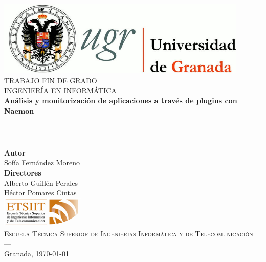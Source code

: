 \begin{titlepage}

\newlength{\centeroffset}
\setlength{\centeroffset}{-0.5\oddsidemargin}
\addtolength{\centeroffset}{0.5\evensidemargin}
\thispagestyle{empty}

\noindent\hspace*{\centeroffset}
\begin{minipage}{\textwidth}

\centering
\includegraphics[width=0.9\textwidth]{imagenes/logo_ugr.jpg}\\[1.4cm]

\textsc{ \Large TRABAJO FIN DE GRADO\\[0.2cm]}
\textsc{ INGENIERÍA EN INFORMÁTICA}\\[1cm]

{\Huge\bfseries Análisis y monitorización de aplicaciones a través de plugins con Naemon\\}
\noindent\rule[-1ex]{\textwidth}{3pt}\\[3.5ex]

\end{minipage}

\vspace{1.0cm}
\noindent\hspace*{\centeroffset}\begin{minipage}{\textwidth}
\centering

\textbf{Autor}\\ {Sofía Fernández Moreno}\\[2.5ex]
\textbf{Directores}\\
{Alberto Guillén Perales\\
Héctor Pomares Cintas}\\[2cm]
\includegraphics[width=0.3\textwidth]{imagenes/etsiit_logo.png}\\[0.1cm]
\textsc{Escuela Técnica Superior de Ingenierías Informática y de Telecomunicación}\\
\textsc{---}\\
Granada, \today
\end{minipage}
\end{titlepage}



